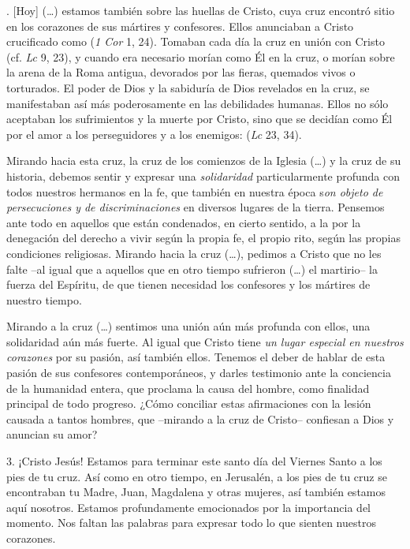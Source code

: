 \begin{body}
. [Hoy] (\ldots) estamos también sobre las huellas de Cristo, cuya cruz encontró sitio en los corazones de sus mártires y confesores. Ellos anunciaban a Cristo crucificado como  (\textit{1 Cor} 1, 24). Tomaban cada día la cruz en unión con Cristo (cf. \textit{Lc} 9, 23), y cuando era necesario morían como Él en la cruz, o morían sobre la arena de la Roma antigua, devorados por las fieras, quemados vivos o torturados. El poder de Dios y la sabiduría de Dios revelados en la cruz, se manifestaban así más poderosamente en las debilidades humanas. Ellos no sólo aceptaban los sufrimientos y la muerte por Cristo, sino que se decidían como Él por el amor a los perseguidores y a los enemigos:  (\textit{Lc} 23, 34).


Mirando hacia esta cruz, la cruz de los comienzos de la Iglesia (\ldots) y la cruz de su historia, debemos sentir y expresar una \textit{solidaridad} particularmente profunda con todos nuestros hermanos en la fe, que también en nuestra época s\textit{on objeto de persecuciones y de discriminaciones} en diversos lugares de la tierra. Pensemos ante todo en aquellos que están condenados, en cierto sentido, a la  por la denegación del derecho a vivir según la propia fe, el propio rito, según las propias condiciones religiosas. Mirando hacia la cruz (\ldots), pedimos a Cristo que no les falte –al igual que a aquellos que en otro tiempo sufrieron (\ldots) el martirio– la fuerza del Espíritu, de que tienen necesidad los confesores y los mártires de nuestro tiempo.

Mirando a la cruz (\ldots) sentimos una unión aún más profunda con ellos, una solidaridad aún más fuerte. Al igual que Cristo tiene \textit{un lugar especial en nuestros corazones} por su pasión, así también ellos. Tenemos el deber de hablar de esta pasión de sus confesores contemporáneos, y darles testimonio ante la conciencia de la humanidad entera, que proclama la causa del hombre, como finalidad principal de todo progreso. ¿Cómo conciliar estas afirmaciones con la lesión causada a tantos hombres, que –mirando a la cruz de Cristo– confiesan a Dios y anuncian su amor?

3. ¡Cristo Jesús! Estamos para terminar este santo día del Viernes Santo a los pies de tu cruz. Así como en otro tiempo, en Jerusalén, a los pies de tu cruz se encontraban tu Madre, Juan, Magdalena y otras mujeres, así también estamos aquí nosotros. Estamos profundamente emocionados por la importancia del momento. Nos faltan las palabras para expresar todo lo que sienten nuestros corazones. 


\end{body}
